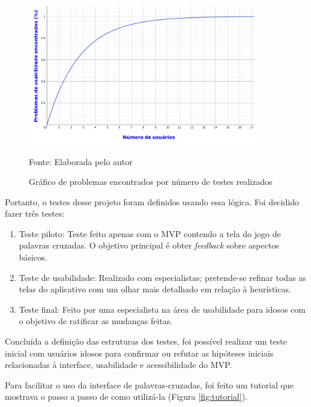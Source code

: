 \begin{figure}[H]
\centering
    \caption{Gráfico de problemas encontrados por número de testes realizados}
    \label{fig:graphnielsen}
    \includegraphics[width=0.9\textwidth]{Figuras/graphNielsen.png}
    
    Fonte: Elaborada pelo autor
\end{figure}

Portanto, o testes desse projeto foram definidos usando essa lógica. Foi decidido fazer três testes:

\begin{enumerate}
    \item Teste piloto: Teste feito apenas com o MVP contendo a tela do jogo de palavras cruzadas. O objetivo principal é obter \textit{feedback} sobre aspectos básicos.
    \item Teste de usabilidade: Realizado com especialistas; pretende-se refinar todas as telas do aplicativo com um olhar mais detalhado em relação à heurísticas.
    \item Teste final: Feito por uma especialista na área de usabilidade para idosos com o objetivo de ratificar as mudanças feitas.
\end{enumerate}

Concluída a definição das estruturas dos testes, foi possível realizar um teste inicial com usuários idosos para confirmar ou refutar as hipóteses iniciais relacionadas à interface, usabilidade e acessibilidade do MVP.

Para facilitar o uso da interface de palavras-cruzadas, foi feito um tutorial que mostrava o passo a passo de como utilizá-la (Figura \ref{fig:tutorial}). 

